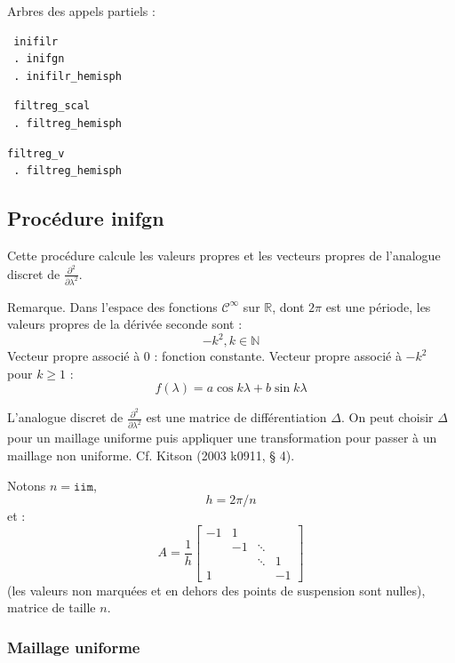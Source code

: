 \documentclass[a4paper,english,french]{article}
\begin{document}
Arbres des appels partiels :
\begin{verbatim}
 inifilr
 . inifgn
 . inifilr_hemisph
\end{verbatim}
\begin{verbatim}
 filtreg_scal
 . filtreg_hemisph
\end{verbatim}
\begin{verbatim}
filtreg_v
 . filtreg_hemisph
\end{verbatim}

\subsection{Procédure inifgn}

Cette procédure calcule les valeurs propres et les vecteurs propres de
l'analogue discret de $\frac{\partial^2}{\partial \lambda^2}$.

Remarque. Dans l'espace des fonctions $\mathscr{C}^\infty$ sur
$\mathbb{R}$, dont $2 \pi$ est une période, les valeurs propres de la
dérivée seconde sont :
\begin{equation*}
  - k^2, k \in \mathbb{N}
\end{equation*}
Vecteur propre associé à 0 : fonction constante. Vecteur propre
associé à $- k^2$ pour $k \ge 1$ :
\begin{equation*}
  f(\lambda) = a \cos k \lambda + b \sin k \lambda
\end{equation*}

L'analogue discret de $\frac{\partial^2}{\partial
  \lambda^2}$ est une matrice de différentiation $\Delta$.  On peut
choisir $\Delta$ pour un maillage uniforme puis appliquer une
transformation pour passer à un maillage non uniforme. Cf. Kitson
(2003 k0911, § 4).

Notons $n = \mathtt{iim}$,
\begin{equation*}
  h = 2 \pi / n
\end{equation*}
et :
\begin{equation*}
  A = \frac{1}{h}
  \begin{bmatrix}
    -1 & 1 \\
    & -1 & \ddots \\
    & & \ddots & 1 \\
    1 & & & -1
  \end{bmatrix}  
\end{equation*}
(les valeurs non marquées et en dehors des points de suspension sont
nulles), matrice de taille $n$.

\subsubsection{Maillage uniforme}
\end{document}
